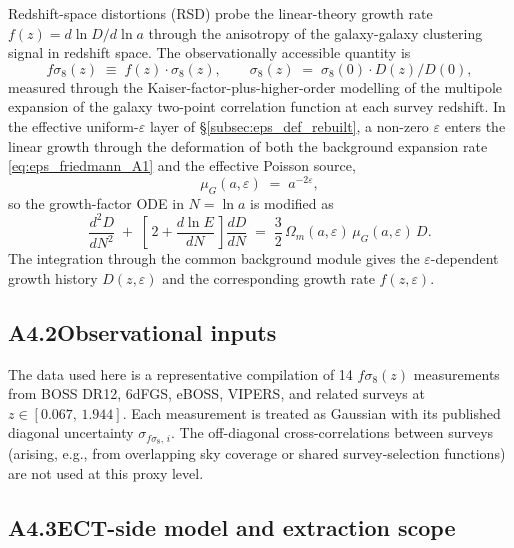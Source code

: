 Redshift-space distortions (RSD) probe the linear-theory growth
rate $f(z) = d\ln D/d\ln a$ through the anisotropy of the
galaxy-galaxy clustering signal in redshift space. The
observationally accessible quantity is
\begin{equation}
f\sigma_8(z)
\;\equiv\; f(z)\cdot\sigma_8(z),
\qquad
\sigma_8(z)
\;=\; \sigma_8(0)\cdot D(z)/D(0),
\end{equation}
measured through the Kaiser-factor-plus-higher-order modelling of
the multipole expansion of the galaxy two-point correlation
function at each survey redshift. In the effective
uniform-$\varepsilon$ layer of
\S\ref{subsec:eps_def_rebuilt}, a non-zero $\varepsilon$ enters the
linear growth through the deformation of both the background
expansion rate \eqref{eq:eps_friedmann_A1} and the effective
Poisson source,
\begin{equation}
\mu_G(a, \varepsilon) \;=\; a^{-2\varepsilon},
\label{eq:mu_G}
\end{equation}
so the growth-factor ODE in $N = \ln a$ is modified as
\begin{equation}
\frac{d^2 D}{dN^2}
\;+\;
\left[\,2 + \frac{d\ln E}{dN}\,\right]\frac{dD}{dN}
\;=\;
\frac{3}{2}\,\Omega_m(a,\varepsilon)\,\mu_G(a,\varepsilon)\, D.
\label{eq:growth_ode_fsigma8}
\end{equation}
The integration through the common background module gives the
$\varepsilon$-dependent growth history $D(z, \varepsilon)$ and
the corresponding growth rate $f(z, \varepsilon)$.

\subsection*{A4.2\quad Observational inputs}

The data used here is a representative compilation of 14
$f\sigma_8(z)$ measurements from BOSS DR12, 6dFGS, eBOSS, VIPERS,
and related surveys at $z \in [0.067,\,1.944]$. Each measurement
is treated as Gaussian with its published diagonal uncertainty
$\sigma_{f\sigma_8,\,i}$. The off-diagonal cross-correlations
between surveys (arising, e.g., from overlapping sky coverage or
shared survey-selection functions) are not used at this proxy
level.

\subsection*{A4.3\quad ECT-side model and extraction scope}

